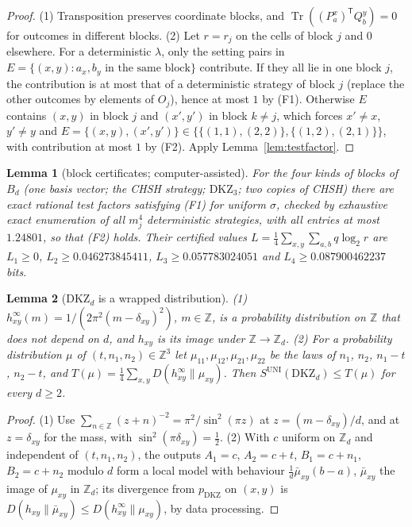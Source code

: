 \documentclass[11pt]{article}
\newtheorem{lemma}{Lemma}[section]
\theoremstyle{remark}
\numberwithin{equation}{section}
\newcommand{\Z}{\mathbb{Z}}
\newcommand{\Tr}{\operatorname{Tr}}
\newcommand{\DKZ}{\mathrm{DKZ}}
\newcommand{\UNI}{\mathrm{UNI}}
\begin{document}
\begin{proof}
(1) Transposition preserves coordinate blocks, and $\Tr((P^x_a)^{\mathsf T}Q^y_b)=0$ for outcomes in different blocks.
(2) Let $r=r_j$ on the cells of block $j$ and $0$ elsewhere. For a deterministic $\lambda$, only the setting pairs in
$E=\{(x,y):a_x,b_y\text{ in the same block}\}$ contribute. If they all lie in one block $j$, the contribution is at most
that of a deterministic strategy of block $j$ (replace the other outcomes by elements of $O_j$), hence at most $1$ by
(F1). Otherwise $E$ contains $(x,y)$ in block $j$ and $(x',y')$ in block $k\ne j$, which forces $x'\ne x$, $y'\ne y$
and $E=\{(x,y),(x',y')\}\in\{\{(1,1),(2,2)\},\{(1,2),(2,1)\}\}$, with contribution at most $1$ by (F2). Apply
Lemma~\ref{lem:testfactor}.
\end{proof}

\begin{lemma}[block certificates; computer-assisted]\label{lem:blocks}
For the four kinds of blocks of $B_d$ (one basis vector; the CHSH strategy; $\DKZ_3$; two copies of CHSH) there are exact
rational test factors satisfying \textup{(F1)} for uniform $\sigma$, checked by exhaustive exact enumeration of all
$m_j^4$ deterministic strategies, with all entries at most $1.24801$, so that \textup{(F2)} holds. Their certified values
$L=\frac14\sum_{x,y}\sum_{a,b}q\log_2r$ are $L_1\ge0$, $L_2\ge0.046273845411$, $L_3\ge0.057783024051$ and
$L_4\ge0.087900462237$ bits.
\end{lemma}

\begin{lemma}[$\DKZ_d$ is a wrapped distribution]\label{lem:wrap}
\textup{(1)} $h^\infty_{xy}(m)=1/(2\pi^2(m-\delta_{xy})^2)$, $m\in\Z$, is a probability distribution on $\Z$ that does not
depend on $d$, and $h_{xy}$ is its image under $\Z\to\Z_d$.
\textup{(2)} For a probability distribution $\mu$ of $(t,n_1,n_2)\in\Z^3$ let $\mu_{11},\mu_{12},\mu_{21},\mu_{22}$ be the
laws of $n_1$, $n_2$, $n_1-t$, $n_2-t$, and $T(\mu)=\frac14\sum_{x,y}D(h^\infty_{xy}\|\mu_{xy})$. Then
$S^{\UNI}(\DKZ_d)\le T(\mu)$ for every $d\ge2$.
\end{lemma}

\begin{proof}
(1) Use $\sum_{n\in\Z}(z+n)^{-2}=\pi^2/\sin^2(\pi z)$ at $z=(m-\delta_{xy})/d$, and at $z=\delta_{xy}$ for the mass, with
$\sin^2(\pi\delta_{xy})=\frac12$. (2) With $c$ uniform on $\Z_d$ and independent of $(t,n_1,n_2)$, the outputs $A_1=c$,
$A_2=c+t$, $B_1=c+n_1$, $B_2=c+n_2$ modulo $d$ form a local model with behaviour $\frac1d\bar\mu_{xy}(b-a)$, $\bar\mu_{xy}$
the image of $\mu_{xy}$ in $\Z_d$; its divergence from $p_{\DKZ}$ on $(x,y)$ is $D(h_{xy}\|\bar\mu_{xy})\le
D(h^\infty_{xy}\|\mu_{xy})$, by data processing.
\end{proof}
\end{document}

